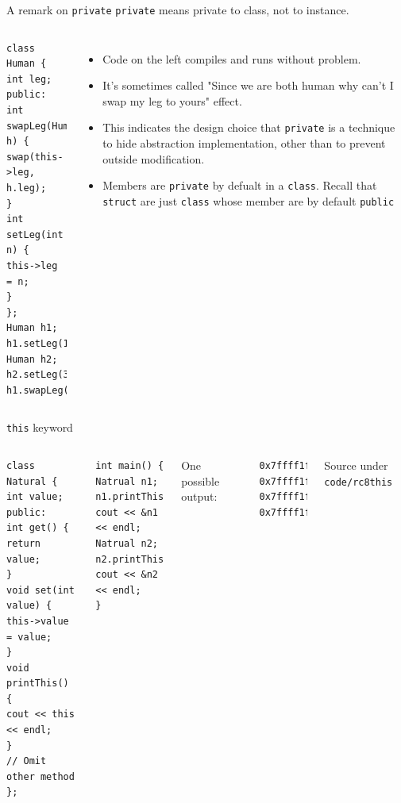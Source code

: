 \begin{frame}[fragile]{A remark on \texttt{private}}
\texttt{private} means private to class, not to instance. 
\begin{columns}[]

\vspace{-.2in}
\begin{verbatim}
class Human {
int leg;
public:
int swapLeg(Human& h) {
swap(this->leg, h.leg);
}
int setLeg(int n) {
this->leg = n;
}
};
Human h1; h1.setLeg(10);
Human h2; h2.setLeg(3);
h1.swapLeg(h2);
\end{verbatim}


\vspace{-.2in}
\begin{itemize}
\item Code on the left compiles and runs without problem.
\item It's sometimes called "Since we are both human why can't I swap my leg to yours" effect.
\item This indicates the design choice that \texttt{private} is a technique to hide abstraction implementation, other than to prevent outside modification. 
\item Members are \alert{\texttt{private} by defualt} in a \texttt{class}. Recall that \texttt{struct} are just \texttt{class} whose member are by default \texttt{public}
\end{itemize}
\end{columns}
\end{frame}

\begin{frame}[fragile]{\texttt{this} keyword}
\begin{columns}[]

\vspace{-.3in}
\begin{verbatim}
class Natural {
int value;
public:
int get() { 
return value;
}
void set(int value) {
this->value = value;
}
void printThis() {
cout << this << endl;
}
// Omit other method
};
\end{verbatim}


\vspace{-.3in}
\begin{verbatim}
int main() {
Natrual n1; 
n1.printThis(); 
cout << &n1 << endl;
Natrual n2; 
n2.printThis();
cout << &n2 << endl;
}
\end{verbatim}

One \alert{possible} output:

\begin{verbatim}
0x7ffff1fd2820
0x7ffff1fd2820
0x7ffff1fd2830
0x7ffff1fd2830
\end{verbatim}

Source under \texttt{code/rc8this}

\end{columns}
\end{frame}

